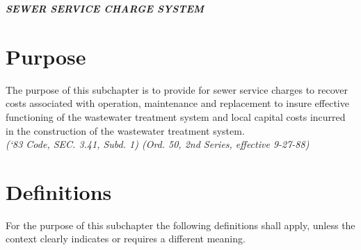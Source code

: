 \begin{center}
\emph{\textbf{\LARGE{SEWER SERVICE CHARGE SYSTEM}}}
\end{center}

\setcounter{section}{54}
\section{Purpose}
The purpose of this subchapter is to provide for sewer service charges to recover costs associated with operation, maintenance and replacement to insure effective functioning of the wastewater treatment system and local capital costs incurred in the construction of the wastewater treatment system.\\
\emph{(‘83 Code, SEC. 3.41, Subd. 1) (Ord. 50, 2nd Series, effective 9-27-88)}
\section{Definitions}
For the purpose of this subchapter the following definitions shall apply, unless the context clearly indicates or requires a different meaning.
